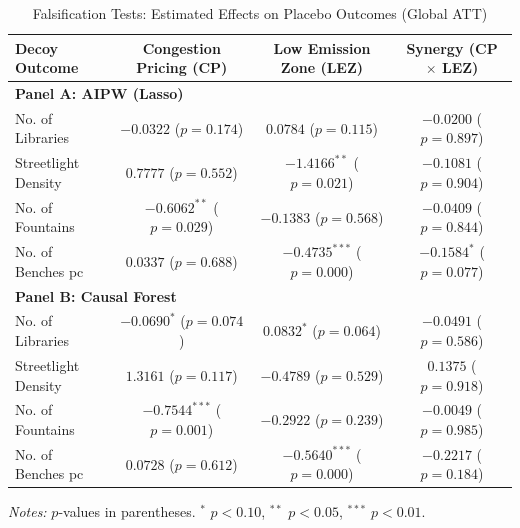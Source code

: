 \begin{table}[htbp]
\centering
\caption{Falsification Tests: Estimated Effects on Placebo Outcomes (Global ATT)}
\label{tab:placebo_tests}
\begin{tabular}{lccc}
\toprule
Decoy Outcome & Congestion Pricing (CP) & Low Emission Zone (LEZ) & Synergy (CP $\times$ LEZ) \\
\midrule
\multicolumn{4}{l}{\textbf{Panel A: AIPW (Lasso)}} \\
\midrule
No. of Libraries & $-0.0322$ ($p=0.174$) & $0.0784$ ($p=0.115$) & $-0.0200$ ($p=0.897$) \\
Streetlight Density & $0.7777$ ($p=0.552$) & $-1.4166^{**}$ ($p=0.021$) & $-0.1081$ ($p=0.904$) \\
No. of Fountains & $-0.6062^{**}$ ($p=0.029$) & $-0.1383$ ($p=0.568$) & $-0.0409$ ($p=0.844$) \\
No. of Benches pc & $0.0337$ ($p=0.688$) & $-0.4735^{***}$ ($p=0.000$) & $-0.1584^{*}$ ($p=0.077$) \\
\midrule
\multicolumn{4}{l}{\textbf{Panel B: Causal Forest}} \\
\midrule
No. of Libraries & $-0.0690^{*}$ ($p=0.074$) & $0.0832^{*}$ ($p=0.064$) & $-0.0491$ ($p=0.586$) \\
Streetlight Density & $1.3161$ ($p=0.117$) & $-0.4789$ ($p=0.529$) & $0.1375$ ($p=0.918$) \\
No. of Fountains & $-0.7544^{***}$ ($p=0.001$) & $-0.2922$ ($p=0.239$) & $-0.0049$ ($p=0.985$) \\
No. of Benches pc & $0.0728$ ($p=0.612$) & $-0.5640^{***}$ ($p=0.000$) & $-0.2217$ ($p=0.184$) \\
\bottomrule
\end{tabular}
\raggedright \footnotesize \textit{Notes:} $p$-values in parentheses. $^{*}$ $p < 0.10$, $^{**}$ $p < 0.05$, $^{***}$ $p < 0.01$.
\end{table}
